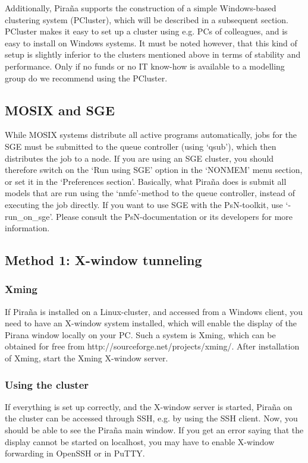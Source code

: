 \documentclass[a4,11pt]{report} \usepackage[pdftex]{graphicx}
\begin{document}
{{Additionally, Pira\~na supports the construction of a simple
Windows-based clustering system (PCluster), which will be described in a
subsequent section. PCluster makes it easy to set up a cluster using
e.g. PCs of colleagues, and is easy to install on Windows systems. It
must be noted however, that this kind of setup is slightly inferior to the
clusters mentioned above in terms of stability and performance. Only
if no funds or no IT know-how is available to a modelling group do we
recommend using the PCluster.

\subsection{MOSIX and SGE}
While MOSIX systems distribute all active programs automatically, jobs
for the SGE must be submitted to the queue controller (using `qsub'),
which then distributes the job to a node. If you are using an SGE
cluster, you should therefore switch on the `Run using SGE' option in
the `NONMEM' menu section, or set it in the `Preferences
section'. Basically, what Pira\~na does is submit all models that are
run using the `nmfe'-method to the queue controller, instead of
executing the job directly. If you want to use SGE with the
PsN-toolkit, use `-run\_on\_sge'. Please consult the PsN-documentation
or its developers for more information.


\subsection{Method 1: X-window tunneling}

\subsubsection*{Xming}
If Pira\~na is installed on a Linux-cluster, and accessed from a
Windows client, you need to have an X-window system installed, which
will enable the display of the Pirana window locally on your PC. Such
a system is Xming, which can be obtained for free from
http://sourceforge.net/projects/xming/. After installation of Xming,
start the Xming X-window server.

\subsubsection*{Using the cluster}
If everything is set up correctly, and the X-window server is started,
Pira\~na on the cluster can be accessed through SSH, e.g. by using the
SSH client. Now, you should be able to see the Pira\~na main
window. If you get an error saying that the display cannot be started
on localhost, you may have to enable X-window forwarding in OpenSSH or in
PuTTY.

}}
\end{document}
